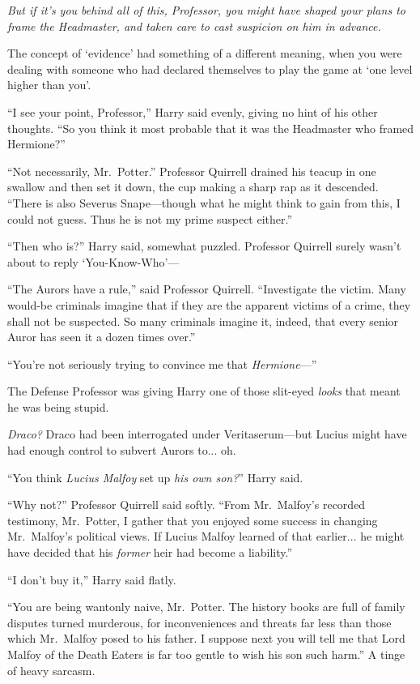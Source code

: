 \emph{But if it’s you behind all of this, Professor, you might have shaped your plans to frame the Headmaster, and taken care to cast suspicion on him in advance.}

The concept of ‘evidence’ had something of a different meaning, when you were dealing with someone who had declared themselves to play the game at ‘one level higher than you’.

“I see your point, Professor,” Harry said evenly, giving no hint of his other thoughts. “So you think it most probable that it was the Headmaster who framed Hermione?”

“Not necessarily, Mr.~Potter.” Professor Quirrell drained his teacup in one swallow and then set it down, the cup making a sharp rap as it descended. “There is also Severus Snape—though what he might think to gain from this, I could not guess. Thus he is not my prime suspect either.”

“Then who is?” Harry said, somewhat puzzled. Professor Quirrell surely wasn’t about to reply ‘You-Know-Who’—

“The Aurors have a rule,” said Professor Quirrell. “Investigate the victim. Many would-be criminals imagine that if they are the apparent victims of a crime, they shall not be suspected. So many criminals imagine it, indeed, that every senior Auror has seen it a dozen times over.”

“You’re not seriously trying to convince me that \emph{Hermione}—”

The Defense Professor was giving Harry one of those slit-eyed \emph{looks} that meant he was being stupid.

\emph{Draco?} Draco had been interrogated under Veritaserum—but Lucius might have had enough control to subvert Aurors to... oh.

“You think \emph{Lucius Malfoy} set up \emph{his own son?}” Harry said.

“Why not?” Professor Quirrell said softly. “From Mr.~Malfoy’s recorded testimony, Mr.~Potter, I gather that you enjoyed some success in changing Mr.~Malfoy’s political views. If Lucius Malfoy learned of that earlier... he might have decided that his \emph{former} heir had become a liability.”

“I don’t buy it,” Harry said flatly.

“You are being wantonly naive, Mr.~Potter. The history books are full of family disputes turned murderous, for inconveniences and threats far less than those which Mr.~Malfoy posed to his father. I suppose next you will tell me that Lord Malfoy of the Death Eaters is far too gentle to wish his son such harm.” A tinge of heavy sarcasm.

